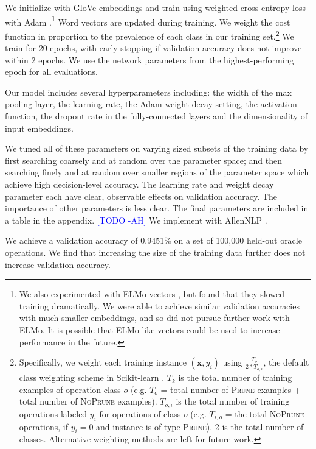 \documentclass[11pt,a4paper]{article}
\newcommand{\ahcomment}[1]{\textcolor{blue}{[#1 -AH]}}
\begin{document}
We initialize with GloVe embeddings \cite{pennington2014glove} and train using weighted cross entropy loss with Adam \cite{Kingma2014AdamAM}.\footnote{We also experimented with ELMo vectors \cite{Peters:2018}, but found that they slowed training dramatically. We were able to achieve similar validation accuracies with much smaller embeddings, and so did not pursue further work with ELMo. It is possible that ELMo-like vectors could be used to increase performance in the future.}  Word vectors are updated during training. We weight the cost function in proportion to the prevalence of each class in our training set.\footnote{Specifically, we weight each training instance $(\bm{x}, y_i)$ using $\frac{T_o}{2 * T_{o,i}}$, the default class weighting scheme in Scikit-learn \cite{Pedregosa:2011:SML:1953048.2078195}. $T_k$ is the total number of training examples of operation class $o$ (e.g. $T_o$ = total number of \textsc{Prune} examples + total number of \textsc{NoPrune} examples). $T_{o,i}$ is the total number of training operations labeled $y_i$ for operations of class $o$ (e.g. $T_{i,o}$ = the total \textsc{NoPrune} operations, if $y_i=0$ and instance is of type \textsc{Prune}). 2 is the total number of classes. Alternative weighting methods are left for future work.} We train for 20 epochs, with early stopping if validation accuracy does not improve within 2 epochs. We use the network parameters from the highest-performing epoch for all evaluations.

Our model includes several hyperparameters including: the width of the max pooling layer, the learning rate, the Adam weight decay setting, the activation function, the dropout rate in the fully-connected layers and the dimensionality of input embeddings. 

We tuned all of these parameters on varying sized subsets of the training data by first searching coarsely and at random \cite{Bergstra2012RandomSF} over the parameter space; and then searching finely and at random over smaller regions of the parameter space which achieve high decision-level accuracy. The learning rate and weight decay parameter each have clear, observable effects on validation accuracy. 
The importance of other parameters is less clear. The final parameters are included in a table in the appendix. \ahcomment{TODO} We implement with AllenNLP \cite{Gardner2017AllenNLP}.

We achieve a validation accuracy of 0.9451\% on a set of 100,000 held-out oracle operations. We find that increasing the size of the training data further does not increase validation accuracy. 
\end{document}
